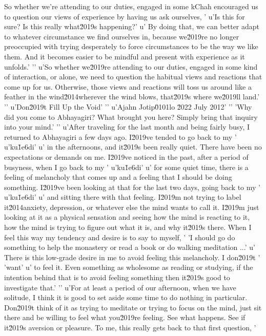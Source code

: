 So whether we're attending to our duties, engaged in some kChah encouraged us to question our views of experience by having us ask ourselves, '
u'Is this for sure? Is this really what\u2019s happening?'
u' By doing that, we can better adapt to whatever circumstance we find ourselves in, because we\u2019re no longer preoccupied with trying desperately to force circumstances to be the way we like them. And it becomes easier to be mindful and present with experience as it unfolds.'
'\n'
u'So whether we\u2019re attending to our duties, engaged in some kind of interaction, or alone, we need to question the habitual views and reactions that come up for us. Otherwise, those views and reactions will toss us around like a feather in the wind\u2014wherever the wind blows, that\u2019s where we\u2019ll land.'
'\n'
u'Don\u2019t Fill Up the Void'
'\n'
u'Ajahn Jotip\u0101lo \u2022 July 2012'
'\n'
'Why did you come to Abhayagiri? What brought you here? Simply bring that inquiry into your mind.'
'\n'
u'After traveling for the last month and being fairly busy, I returned to Abhayagiri a few days ago. I\u2019ve tended to go back to my '
u'ku\u1e6di'
u' in the afternoons, and it\u2019s been really quiet. There have been no expectations or demands on me. I\u2019ve noticed in the past, after a period of busyness, when I go back to my '
u'ku\u1e6di'
u' for some quiet time, there is a feeling of melancholy that comes up and a feeling that I should be doing something. I\u2019ve been looking at that for the last two days, going back to my '
u'ku\u1e6di'
u' and sitting there with that feeling. I\u2019m not trying to label it\u2014anxiety, depression, or whatever else the mind wants to call it. I\u2019m just looking at it as a physical sensation and seeing how the mind is reacting to it, how the mind is trying to figure out what it is, and why it\u2019s there. When I feel this way my tendency and desire is to say to myself, '
'I should go do something to help the monastery or read a book or do walking meditation ...'
u' There is this low-grade desire in me to avoid feeling this melancholy. I don\u2019t '
'want'
u' to feel it. Even something as wholesome as reading or studying, if the intention behind that is to avoid feeling something then it\u2019s good to investigate that.'
'\n'
u'For at least a period of our afternoon, when we have solitude, I think it is good to set aside some time to do nothing in particular. Don\u2019t think of it as trying to meditate or trying to focus on the mind, just sit there and be willing to feel what you\u2019re feeling. See what happens. See if it\u2019s aversion or pleasure. To me, this really gets back to that first question, '
